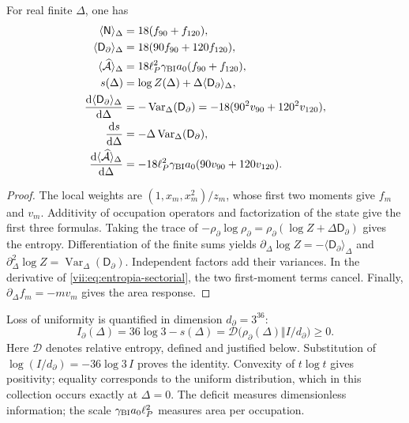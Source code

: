 \begin{proposition}
\label{vii:prop:respuesta-sectorial}
For real finite \(\Delta\), one has
\begin{align}
 \langle\mathsf N\rangle_\Delta&=18(f_{90}+f_{120}),\\
 \langle\mathsf D_\partial\rangle_\Delta&=18(90f_{90}+120f_{120}),\\
 \langle\widehat{\mathcal A}\rangle_\Delta
 &=18\ell_P^2\gamma_{\rm BI}a_0(f_{90}+f_{120}),\\
 s(\Delta)&=\log Z(\Delta)+\Delta\langle\mathsf D_\partial\rangle_\Delta,
 \label{vii:eq:entropia-sectorial}\\
 \frac{\mathrm d\langle\mathsf D_\partial\rangle_\Delta}{\mathrm d\Delta}
 &=-\operatorname{Var}_\Delta(\mathsf D_\partial)
  =-18(90^2v_{90}+120^2v_{120}),\\
 \frac{\mathrm ds}{\mathrm d\Delta}
 &=-\Delta\operatorname{Var}_\Delta(\mathsf D_\partial),\\
 \frac{\mathrm d\langle\widehat{\mathcal A}\rangle_\Delta}{\mathrm d\Delta}
 &=-18\ell_P^2\gamma_{\rm BI}a_0(90v_{90}+120v_{120}).
 \label{vii:eq:respuestas-area-entropia}
\end{align}
\end{proposition}
\begin{proof}
The local weights are \((1,x_m,x_m^2)/z_m\), whose first two
moments give \(f_m\) and \(v_m\). Additivity of occupation
operators and factorization of the state give the first three formulas.
Taking the trace of
\(-\rho_\partial\log\rho_\partial
=\rho_\partial(\log Z+\Delta\mathsf D_\partial)\)
gives the entropy. Differentiation of the finite sums yields
\(\partial_\Delta\log Z=-\langle\mathsf D_\partial\rangle_\Delta\)
and \(\partial_\Delta^2\log Z
=\operatorname{Var}_\Delta(\mathsf D_\partial)\).
Independent factors add their variances. In the derivative of
\eqref{vii:eq:entropia-sectorial}, the two first-moment
terms cancel. Finally, \(\partial_\Delta f_m=-mv_m\)
gives the area response.
\end{proof}

Loss of uniformity is quantified in dimension \(d_\partial=3^{36}\):
\begin{equation}
 I_\partial(\Delta)
 =36\log3-s(\Delta)
 =\mathcal D\bigl(\rho_\partial(\Delta)\Vert I/d_\partial\bigr)\ge0.
 \label{vii:eq:deficit-informacional}
\end{equation}
Here \(\mathcal D\) denotes relative entropy, defined and justified
below. Substitution of \(\log(I/d_\partial)=-36\log3\,I\) proves the
identity. Convexity of \(t\log t\) gives positivity; equality
corresponds to the uniform distribution, which in this collection occurs
exactly at \(\Delta=0\). The deficit measures dimensionless information;
the scale \(\gamma_{\rm BI}a_0\ell_P^2\) measures area per occupation.

